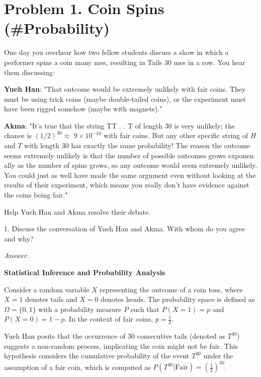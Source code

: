 \documentclass[12pt]{article}
\author{adzetto}
\begin{document}
\maketitle\thispagestyle{fancy}

\pagestyle{fancy}
\tableofcontents
\newpage
\section*{Problem 1. Coin Spins (\#Probability)}

One day you overhear how two fellow students discuss a show in which a performer spins a coin many mes, resulting in Tails 30 mes in a row. You hear them discussing:

\textbf{Yueh Han}: "That outcome would be extremely unlikely with fair coins. They must be using trick coins (maybe double-tailed coins), or the experiment must have been rigged somehow (maybe with magnets)."

\textbf{Akma}: "It's true that the string TT . . T of length 30 is very unlikely; the chance is $(1 / 2)^{30} \approx$ $9 \times 10^{-10}$ with fair coins. But any other specific string of $H$ and $T$ with length 30 has exactly the same probability! The reason the outcome seems extremely unlikely is that the number of possible outcomes grows exponen ally as the number of spins grows, so any outcome would seem extremely unlikely. You could just as well have made the same argument even without looking at the results of their experiment, which means you really don't have evidence against the coins being fair."

Help Yueh Han and Akma resolve their debate.

\begin{q}
1. Discuss the conversation of Yueh Han and Akma. With whom do you agree and why?
\end{q}


\textit{Answer.}

\textbf{Statistical Inference and Probability Analysis}

Consider a random variable \( X \) representing the outcome of a coin toss, where \( X = 1 \) denotes tails and \( X = 0 \) denotes heads. The probability space is defined as \( \Omega = \{0, 1\} \) with a probability measure \( P \) such that \( P(X=1) = p \) and \( P(X=0) = 1-p \). In the context of fair coins, \( p = \frac{1}{2} \).

Yueh Han posits that the occurrence of 30 consecutive tails (denoted as \( T^{30} \)) suggests a non-random process, implicating the coin might not be fair. This hypothesis considers the cumulative probability of the event \( T^{30} \) under the assumption of a fair coin, which is computed as \( P(T^{30}| \text{Fair}) = \left(\frac{1}{2}\right)^{30} \).
\end{document}
